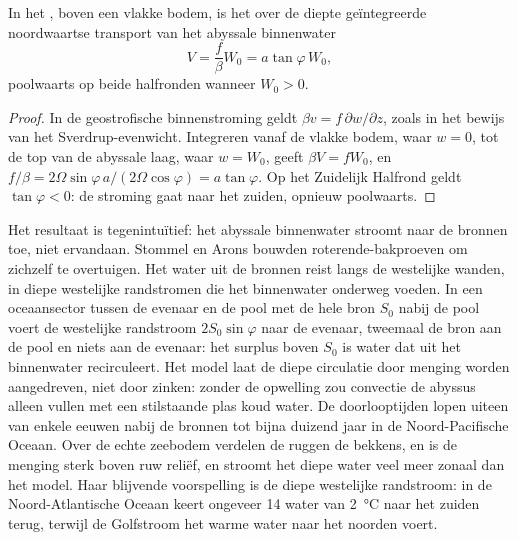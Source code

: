 \begin{proposition}\label{prop:b3:ocean-dynamics:abyssal}
In het , boven een vlakke bodem, is het over de diepte geïntegreerde
noordwaartse transport van het abyssale binnenwater
\[
V = \frac{f}{\beta}W_0 = a\tan\varphi\,W_0 ,
\]
poolwaarts op beide halfronden wanneer $W_0 > 0$.
\end{proposition}

\begin{proof}
In de geostrofische binnenstroming geldt $\beta v = f\,\partial w/\partial z$, zoals in het
bewijs van het Sverdrup-evenwicht. Integreren vanaf de vlakke bodem, waar
$w = 0$, tot de top van de abyssale laag, waar $w = W_0$, geeft $\beta V =
fW_0$, en $f/\beta = 2\Omega\sin\varphi\,a/(2\Omega\cos\varphi) =
a\tan\varphi$. Op het Zuidelijk Halfrond geldt $\tan\varphi < 0$: de stroming
gaat naar het zuiden, opnieuw poolwaarts.
\end{proof}

Het resultaat is tegenintuïtief: het abyssale binnenwater stroomt naar de
bronnen toe, niet ervandaan. Stommel en Arons bouwden roterende-bakproeven
om zichzelf te overtuigen. Het water uit de bronnen reist
langs de westelijke wanden, in diepe westelijke randstromen die het binnenwater
onderweg voeden. In een oceaansector tussen de evenaar en de pool
met de hele bron $S_0$ nabij de pool voert de westelijke randstroom
$2S_0\sin\varphi$ naar de evenaar, tweemaal de bron aan de pool en
niets aan de evenaar: het surplus boven $S_0$ is water dat uit het binnenwater
recirculeert. Het model laat de diepe circulatie door menging worden aangedreven,
niet door zinken: zonder de opwelling zou convectie de abyssus alleen vullen
met een stilstaande plas koud water. De doorlooptijden lopen uiteen van
enkele eeuwen nabij de bronnen tot bijna duizend jaar in de Noord-Pacifische Oceaan.
Over de echte zeebodem verdelen de ruggen de bekkens, en is de menging
sterk boven ruw reliëf, en stroomt het diepe water veel meer zonaal dan het
model. Haar blijvende voorspelling is de diepe westelijke randstroom: in
de Noord-Atlantische Oceaan keert ongeveer \qty{14}{\sverdrup} water van
\qty{2}{\celsius} naar het zuiden terug, terwijl de Golfstroom het warme
water naar het noorden voert.

